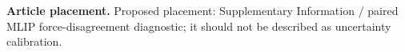 \textbf{Article placement.} Proposed placement: Supplementary Information / paired MLIP force-disagreement diagnostic; it should not be described as uncertainty calibration.
